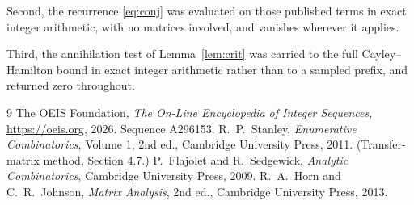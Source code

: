 \documentclass[11pt,a4paper]{article}
\theoremstyle{plain}
\theoremstyle{definition}
\begin{document}
Second, the recurrence \eqref{eq:conj} was evaluated on those published terms in exact
integer arithmetic, with no matrices involved, and vanishes wherever it applies.

Third, the annihilation test of Lemma~\ref{lem:crit} was carried to the full
Cayley--Hamilton bound in exact integer arithmetic rather than to a sampled prefix, and
returned zero throughout.

\begin{thebibliography}{9}
 The OEIS Foundation, \emph{The On-Line Encyclopedia of Integer
Sequences}, \url{https://oeis.org}, 2026. Sequence A296153.
 R.~P.~Stanley, \emph{Enumerative Combinatorics}, Volume 1, 2nd ed.,
Cambridge University Press, 2011. (Transfer-matrix method, Section 4.7.)
 P.~Flajolet and R.~Sedgewick, \emph{Analytic Combinatorics}, Cambridge
University Press, 2009.
 R.~A.~Horn and C.~R.~Johnson, \emph{Matrix Analysis}, 2nd ed., Cambridge
University Press, 2013.
\end{thebibliography}
\end{document}
